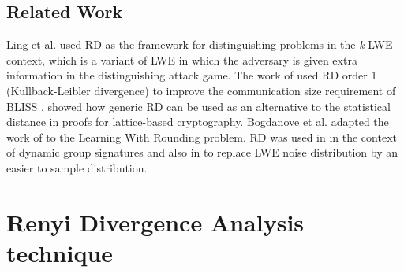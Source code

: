 \subsection{Related Work}
\label{sec:renyiRelatedWorks}
Ling et al. \cite{ling2017hardness} used RD as the framework for distinguishing
problems in the \textit{k}-LWE context, which is a variant of LWE in which the
adversary is given extra information in the distinguishing attack game. The
work of \cite{poppelmann2014enhanced27} used RD order 1 (Kullback-Leibler
divergence) to improve the communication size requirement of BLISS
\cite{ducas2013lattice11}. \cite{bai2015improved5} showed how generic RD can
be used as an alternative to the statistical distance in proofs for
lattice-based cryptography.  Bogdanove et al. \cite{bogdanov2016hardness4}
adapted the work of \cite{bai2015improved5} to the Learning With Rounding
problem. RD was used in \cite{libert2016signature} in the context of dynamic
group signatures and also in \cite{alkim2016post} to replace LWE noise
distribution by an easier to sample distribution.


\section{Renyi Divergence Analysis technique}
\label{sec:secProcRenyi}

